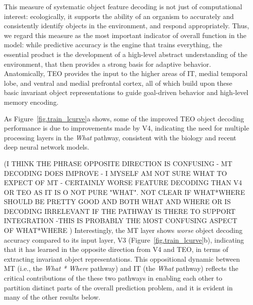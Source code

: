 \documentclass[11pt,twoside]{article}
\newif\myifpdf
\begin{document}
This measure of systematic object feature decoding is not just of computational interest: ecologically, it supports the ability of an organism to accurately and consistently identify objects in the environment, and respond appropriately.  Thus, we regard this measure as the most important indicator of overall function in the model: while predictive accuracy is the engine that trains everything, the essential product is the development of a high-level abstract understanding of the environment, that then provides a strong basis for adaptive behavior.  Anatomically, TEO provides the input to the higher areas of IT, medial temporal lobe, and ventral and medial prefrontal cortex, all of which build upon these basic invariant object representations to guide goal-driven behavior and high-level memory encoding.

As Figure~\ref{fig.train_lcurve}a shows, some of the improved TEO object decoding performance is due to improvements made by V4, indicating the need for multiple processing layers in the {\em What} pathway, consistent with the biology and recent deep neural network models.

(I THINK THE PHRASE OPPOSITE DIRECTION IS CONFUSING - MT DECODING DOES IMPROVE - I MYSELF AM NOT SURE WHAT TO EXPECT OF MT - CERTAINLY WORSE FEATURE DECODING THAN V4 OR TEO AS IT IS O NOT PURE "WHAT". NOT CLEAR IF WHAT*WHERE SHOULD BE PRETTY GOOD AND BOTH WHAT AND WHERE OR IS DECODING IRRELEVANT IF THE PATHWAY IS THERE TO SUPPORT INTEGRATION -THIS IS PROBABLY THE MOST CONFUSING ASPECT OF WHAT*WHERE )
Interestingly, the MT layer shows {\em worse} object decoding accuracy compared to its input layer, V3 (Figure~\ref{fig.train_lcurve}b), indicating that it has learned in the opposite direction from V4 and TEO, in terms of extracting invariant object representations.  This oppositional dynamic between MT (i.e., the {\em What * Where} pathway) and IT (the {\em What} pathway) reflects the critical contributions of the these two pathways in enabling each other to partition distinct parts of the overall prediction problem, and it is evident in many of the other results below.
\end{document}

